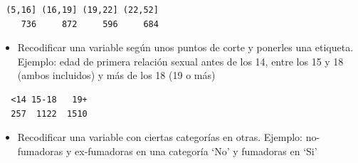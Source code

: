 \documentclass[
]{book}
\newenvironment{Shaded}{\begin{snugshade}}{\end{snugshade}}
\newcommand{\AttributeTok}[1]{\textcolor[rgb]{0.77,0.63,0.00}{#1}}
\newcommand{\ConstantTok}[1]{\textcolor[rgb]{0.00,0.00,0.00}{#1}}
\newcommand{\DecValTok}[1]{\textcolor[rgb]{0.00,0.00,0.81}{#1}}
\newcommand{\FunctionTok}[1]{\textcolor[rgb]{0.00,0.00,0.00}{#1}}
\newcommand{\NormalTok}[1]{#1}
\newcommand{\OtherTok}[1]{\textcolor[rgb]{0.56,0.35,0.01}{#1}}
\newcommand{\SpecialCharTok}[1]{\textcolor[rgb]{0.00,0.00,0.00}{#1}}
\newcommand{\StringTok}[1]{\textcolor[rgb]{0.31,0.60,0.02}{#1}}
\providecommand{\tightlist}{%
  \setlength{\itemsep}{0pt}\setlength{\parskip}{0pt}}
\begin{document}
\begin{verbatim}
 (5,16] (16,19] (19,22] (22,52] 
    736     872     596     684 
\end{verbatim}

\begin{itemize}
\tightlist
\item
  Recodificar una variable según unos puntos de corte y ponerles una etiqueta. Ejemplo: edad de primera relación sexual antes de los 14, entre los 15 y 18 (ambos incluidos) y más de los 18 (19 o más)
\end{itemize}

\begin{Shaded}
\end{Shaded}

\begin{verbatim}
  <14 15-18   19+ 
  257  1122  1510 
\end{verbatim}

\begin{itemize}
\tightlist
\item
  Recodificar una variable con ciertas categorías en otras. Ejemplo: no-fumadoras y ex-fumadoras en una categoría `No' y fumadoras en `Si'
\end{itemize}

\begin{Shaded}
\end{Shaded}
\end{document}
